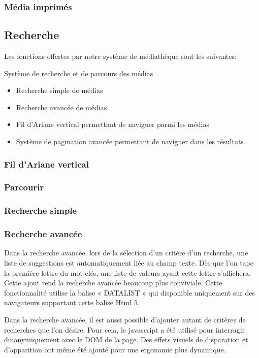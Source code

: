 \documentclass[letter, 11pt, draft]{report}
\begin{document}
\subsubsection{Média imprimés}

\subsection{Recherche}

Les fonctions offertes par notre système de médiathèque sont les suivantes:

Système de recherche et de parcours des médias
\begin{itemize}
	\item Recherche simple de médias
	\item Recherche avancée de médias
	\item Fil d'Ariane vertical permettant de naviguer parmi les médias
	\item Système de pagination avancée permettant de naviguer dans les résultats
\end{itemize}

\subsubsection{Fil d'Ariane vertical}

\subsubsection{Parcourir}

\subsubsection{Recherche simple}

\subsubsection{Recherche avancée}

Dans la recherche avancée, lors de la sélection d'un critère d'un recherche, une liste de suggestions est automatiquement liée au champ texte. Dès que l'on tape la première lettre du mot clés, une liste de valeurs ayant cette lettre s'affichera. Cette ajout rend la recherche avancée beaucoup plus conviviale. Cette fonctionnalité utilise la balise « DATALIST » qui disponible uniquement sur des navigateurs supportant cette balise Html 5.

Dans la recherche avancée, il est aussi possible d'ajouter autant de critères de recherches que l'on désire. Pour cela, le javascript a été utilisé pour interragir dinanymiquement avec le DOM de la page. Des effets visuels de disparation et d'apparition ont même été ajouté pour une ergonomie plus dynamique.
\end{document}
